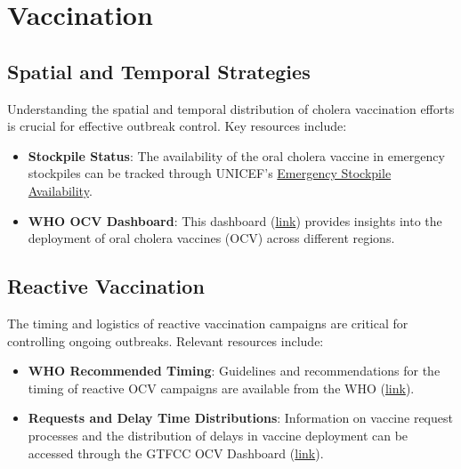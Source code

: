 \documentclass[
]{book}
\providecommand{\tightlist}{%
  \setlength{\itemsep}{0pt}\setlength{\parskip}{0pt}}
\begin{document}
\section{Vaccination}\label{vaccination}

\subsection{Spatial and Temporal Strategies}\label{spatial-and-temporal-strategies}

Understanding the spatial and temporal distribution of cholera vaccination efforts is crucial for effective outbreak control. Key resources include:

\begin{itemize}
\tightlist
\item
  \textbf{Stockpile Status}: The availability of the oral cholera vaccine in emergency stockpiles can be tracked through UNICEF's \href{https://www.unicef.org/supply/documents/emergency-stockpile-availability-oral-cholera-vaccine}{Emergency Stockpile Availability}.
\item
  \textbf{WHO OCV Dashboard}: This dashboard (\href{https://app.powerbi.com/view?r=eyJrIjoiYmFmZTBmM2EtYWM3Mi00NWYwLTg3YjgtN2Q0MjM5ZmE1ZjFkIiwidCI6ImY2MTBjMGI3LWJkMjQtNGIzOS04MTBiLTNkYzI4MGFmYjU5MCIsImMiOjh9}{link}) provides insights into the deployment of oral cholera vaccines (OCV) across different regions.
\end{itemize}

\subsection{Reactive Vaccination}\label{reactive-vaccination}

The timing and logistics of reactive vaccination campaigns are critical for controlling ongoing outbreaks. Relevant resources include:

\begin{itemize}
\tightlist
\item
  \textbf{WHO Recommended Timing}: Guidelines and recommendations for the timing of reactive OCV campaigns are available from the WHO (\href{https://www.who.int/groups/icg/cholera/stockpiles}{link}).
\item
  \textbf{Requests and Delay Time Distributions}: Information on vaccine request processes and the distribution of delays in vaccine deployment can be accessed through the GTFCC OCV Dashboard (\href{https://apps.epicentre-msf.org/public/app/gtfcc}{link}).
\end{itemize}
\end{document}
